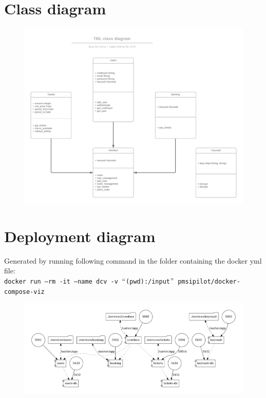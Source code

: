 \documentclass[10pt,a4paper,twocolumn]{article}
\begin{document}
\newpage
\clearpage
\newpage
\begin{appendices}
	\section{Class diagram}
	\begin{figure}[h]
		\includegraphics*[scale=0.7]{class-diagram.png}
	\end{figure}

	\clearpage
	\newpage
	
	\section{Deployment diagram}
	Generated by running following command in the folder containing the docker yml file: \\
	\texttt{docker run --rm -it --name dcv -v $``$(pwd):/input$"$ pmsipilot/docker-compose-viz}\\
	\begin{figure}[h]
		\includegraphics*[scale=0.3]{docker-compose.png}
	\end{figure}
	

\end{appendices}
\end{document}
